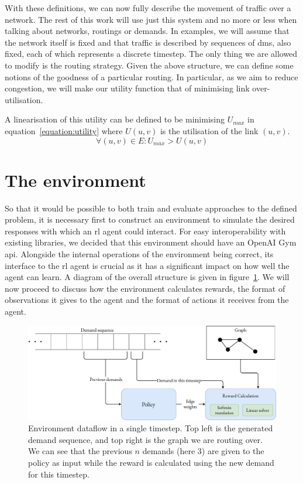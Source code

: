 With these definitions, we can now fully describe the movement of traffic over a network. The rest of this work will use just this system and no more or less when talking about networks, routings or demands. In examples, we will assume that the network itself is fixed and that traffic is described by sequences of \acp{dm}, also fixed, each of which represents a discrete timestep. The only thing we are allowed to modify is the routing strategy. Given the above structure, we can define some notions of the goodness of a particular routing. In particular, as we aim to reduce congestion, we will make our utility function that of minimising link over-utilisation.

A linearisation of this utility can be defined to be minimising $U_{max}$ in equation~\ref{equation:utility} where $U(u,v)$ is the utilisation of the link $(u,v)$.
\begin{equation}
  \label{equation:utility}
  \forall (u,v) \in E: U_{max} > U(u,v)
\end{equation}


\section{The environment}
So that it would be possible to both train and evaluate approaches to the defined problem, it is necessary first to construct an environment to simulate the desired responses with which an \ac{rl} agent could interact. For easy interoperability with existing libraries, we decided that this environment should have an OpenAI Gym\cite{brockman2016openai} \acs{api}. Alongside the internal operations of the environment being correct, its interface to the \ac{rl} agent is crucial as it has a significant impact on how well the agent can learn. A diagram of the overall structure is given in figure~\ref{fig:environment}. We will now proceed to discuss how the environment calculates rewards, the format of observations it gives to the agent and the format of actions it receives from the agent.

\begin{figure}
  \centering
  \includegraphics[width=\textwidth]{figures/environment.pdf}
  \caption{Environment dataflow in a single timestep. Top left is the generated demand sequence, and top right is the graph we are routing over. We can see that the previous $n$ demands (here 3) are given to the policy as input while the reward is calculated using the new demand for this timestep.}
  \label{fig:environment}
\end{figure}

